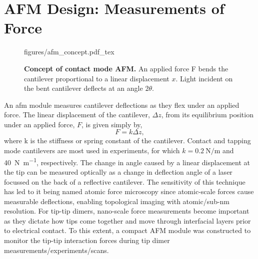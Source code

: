 \documentclass{article}
\begin{document}
\section{AFM Design: Measurements of Force}

\begin{wrapfigure}{O}{0.38\textwidth}
\centering
\vspace{-10pt}
\fontsize{10pt}{1em}\selectfont
\def\svgwidth{\textwidth}
{figures/afm_concept.pdf_tex}
\caption[Concept of contact mode AFM]{\textbf{Concept of contact mode AFM.} An applied force \gls{F} bends the cantilever proportional to a linear displacement $x$. Light incident on the bent cantilever deflects at an angle $2\theta$.}
\label{fig:afm_concept}
\vspace{-5pt}
\end{wrapfigure}

An \gls{afm} module measures cantilever deflections as they flex under an applied force. The linear displacement of the cantilever, $\Delta z$, from its equilibrium position under an applied force, $F$, is given simply by,
\begin{equation}
	F=k\Delta z, \label{eq:hookes_law}
\end{equation}
where \gls{k} is the stiffness or spring constant of the cantilever. Contact and tapping mode cantilevers are most used in experiments, for which $k=\SI{0.2}{\newton\per\metre}$ and \SI{40}{\newton\per\metre}, respectively. The change in angle caused by a linear displacement at the tip can be measured optically as a change in deflection angle of a laser focussed on the back of a reflective cantilever. The sensitivity of this technique has led to it being named atomic force microscopy since atomic-scale forces cause measurable deflections, enabling topological imaging with {\color{red}atomic/sub-nm} resolution. For tip-tip dimers, nano-scale force measurements become important as they dictate how tips come together and move through interfacial layers prior to electrical contact. To this extent, a compact AFM module was constructed to monitor the tip-tip interaction forces during tip dimer {\color{red}measurements/experiments/scans}.
\end{document}
